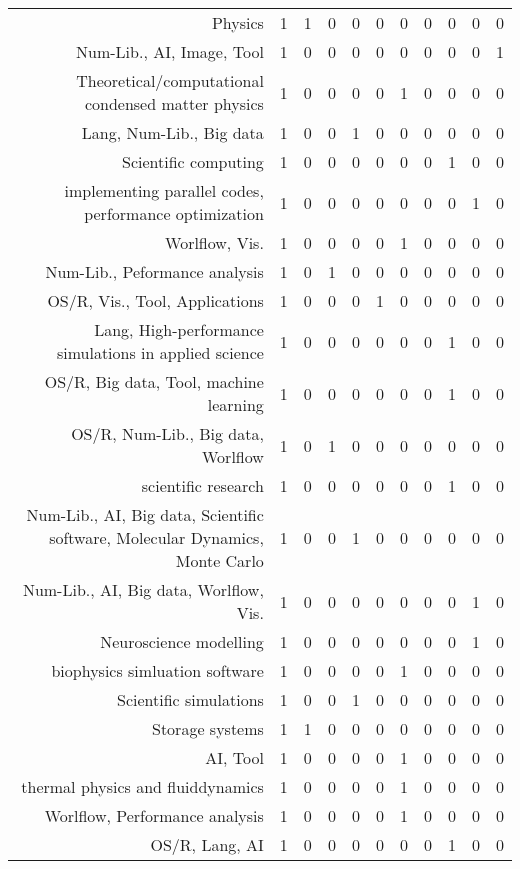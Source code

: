 {\begin{landscape}
\begin{longtable}[htb]{r|c|c|c|c|c|c|c|c|c|c}
{Physics} & 1 & 1 & 0 & 0 & 0 & 0 & 0 & 0 & 0 & 0 \\%
{Num-Lib., AI, Image, Tool} & 1 & 0 & 0 & 0 & 0 & 0 & 0 & 0 & 0 & 1 \\%
{Theoretical/computational condensed matter physics} & 1 & 0 & 0 & 0 & 0 & 1 & 0 & 0 & 0 & 0 \\%
{Lang, Num-Lib., Big data} & 1 & 0 & 0 & 1 & 0 & 0 & 0 & 0 & 0 & 0 \\%
{Scientific computing} & 1 & 0 & 0 & 0 & 0 & 0 & 0 & 1 & 0 & 0 \\%
{implementing parallel codes, performance optimization} & 1 & 0 & 0 & 0 & 0 & 0 & 0 & 0 & 1 & 0 \\%
{Worlflow, Vis.} & 1 & 0 & 0 & 0 & 0 & 1 & 0 & 0 & 0 & 0 \\%
{Num-Lib., Peformance analysis} & 1 & 0 & 1 & 0 & 0 & 0 & 0 & 0 & 0 & 0 \\%
{OS/R, Vis., Tool, Applications} & 1 & 0 & 0 & 0 & 1 & 0 & 0 & 0 & 0 & 0 \\%
{Lang, High-performance simulations in applied science} & 1 & 0 & 0 & 0 & 0 & 0 & 0 & 1 & 0 & 0 \\%
{OS/R, Big data, Tool, machine learning} & 1 & 0 & 0 & 0 & 0 & 0 & 0 & 1 & 0 & 0 \\%
{OS/R, Num-Lib., Big data, Worlflow} & 1 & 0 & 1 & 0 & 0 & 0 & 0 & 0 & 0 & 0 \\%
{scientific research} & 1 & 0 & 0 & 0 & 0 & 0 & 0 & 1 & 0 & 0 \\%
{Num-Lib., AI, Big data, Scientific software, Molecular Dynamics, Monte Carlo} & 1 & 0 & 0 & 1 & 0 & 0 & 0 & 0 & 0 & 0 \\%
{Num-Lib., AI, Big data, Worlflow, Vis.} & 1 & 0 & 0 & 0 & 0 & 0 & 0 & 0 & 1 & 0 \\%
{Neuroscience modelling} & 1 & 0 & 0 & 0 & 0 & 0 & 0 & 0 & 1 & 0 \\%
{biophysics simluation software} & 1 & 0 & 0 & 0 & 0 & 1 & 0 & 0 & 0 & 0 \\%
{Scientific simulations} & 1 & 0 & 0 & 1 & 0 & 0 & 0 & 0 & 0 & 0 \\%
{Storage systems} & 1 & 1 & 0 & 0 & 0 & 0 & 0 & 0 & 0 & 0 \\%
{AI, Tool} & 1 & 0 & 0 & 0 & 0 & 1 & 0 & 0 & 0 & 0 \\%
{thermal physics and fluiddynamics} & 1 & 0 & 0 & 0 & 0 & 1 & 0 & 0 & 0 & 0 \\%
{Worlflow, Performance analysis} & 1 & 0 & 0 & 0 & 0 & 1 & 0 & 0 & 0 & 0 \\%
{OS/R, Lang, AI} & 1 & 0 & 0 & 0 & 0 & 0 & 0 & 1 & 0 & 0 \\%

\end{longtable}
\end{landscape}}
